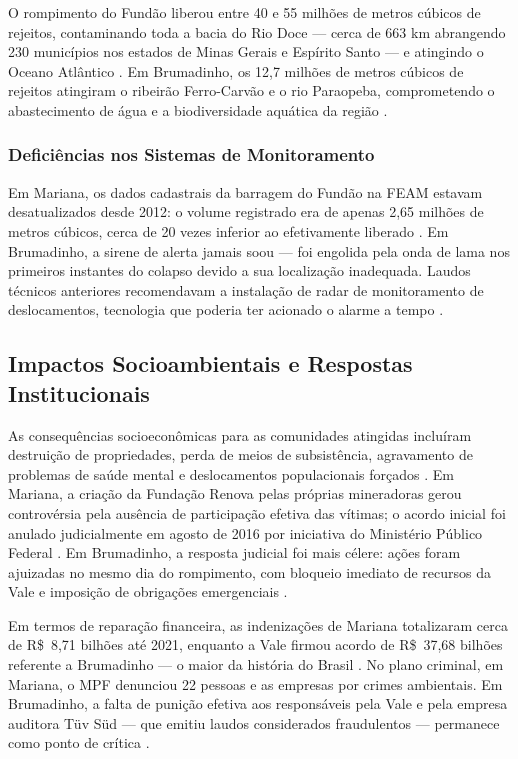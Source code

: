 O rompimento do Fundão liberou entre 40 e 55 milhões de metros cúbicos de rejeitos, contaminando toda a bacia do Rio Doce --- cerca de 663 km abrangendo 230 municípios nos estados de Minas Gerais e Espírito Santo --- e atingindo o Oceano Atlântico \cite{brasil2024timeline, projetomanuelzao2015}. Em Brumadinho, os 12,7 milhões de metros cúbicos de rejeitos atingiram o ribeirão Ferro-Carvão e o rio Paraopeba, comprometendo o abastecimento de água e a biodiversidade aquática da região \cite{minasgerais2024historico}.

\subsubsection{Deficiências nos Sistemas de Monitoramento}

Em Mariana, os dados cadastrais da barragem do Fundão na FEAM estavam desatualizados desde 2012: o volume registrado era de apenas 2,65 milhões de metros cúbicos, cerca de 20 vezes inferior ao efetivamente liberado \cite{projetomanuelzao2015}. Em Brumadinho, a sirene de alerta jamais soou --- foi engolida pela onda de lama nos primeiros instantes do colapso devido a sua localização inadequada. Laudos técnicos anteriores recomendavam a instalação de radar de monitoramento de deslocamentos, tecnologia que poderia ter acionado o alarme a tempo \cite{taliberti2025tragedia, metropoles2019laudos}.

\subsection{Impactos Socioambientais e Respostas Institucionais}

As consequências socioeconômicas para as comunidades atingidas incluíram destruição de propriedades, perda de meios de subsistência, agravamento de problemas de saúde mental e deslocamentos populacionais forçados \cite{estadominas2024alerta}. Em Mariana, a criação da Fundação Renova pelas próprias mineradoras gerou controvérsia pela ausência de participação efetiva das vítimas; o acordo inicial foi anulado judicialmente em agosto de 2016 por iniciativa do Ministério Público Federal \cite{greenpeace2016valor}. Em Brumadinho, a resposta judicial foi mais célere: ações foram ajuizadas no mesmo dia do rompimento, com bloqueio imediato de recursos da Vale e imposição de obrigações emergenciais \cite{minasgerais2024historico}.

Em termos de reparação financeira, as indenizações de Mariana totalizaram cerca de R\$~8,71 bilhões até 2021, enquanto a Vale firmou acordo de R\$~37,68 bilhões referente a Brumadinho --- o maior da história do Brasil \cite{brasil2022indenizacoes}. No plano criminal, em Mariana, o MPF denunciou 22 pessoas e as empresas por crimes ambientais. Em Brumadinho, a falta de punição efetiva aos responsáveis pela Vale e pela empresa auditora Tüv Süd --- que emitiu laudos considerados fraudulentos --- permanece como ponto de crítica \cite{modelli2024brumadinho}.

